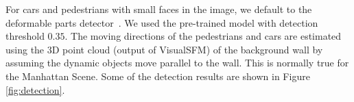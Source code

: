 For cars and pedestrians with small faces in the image, we default to the deformable parts
detector~\cite{lsvm-pami,voc-release5}. %
We used the pre-trained model with detection threshold $0.35$.
The moving directions of the pedestrians and cars are estimated using the 3D point cloud (output of VisualSFM) of the background wall by assuming the dynamic objects move parallel to the wall. This is normally true for the Manhattan Scene. Some of the detection results are shown in Figure \ref{fig:detection}.

